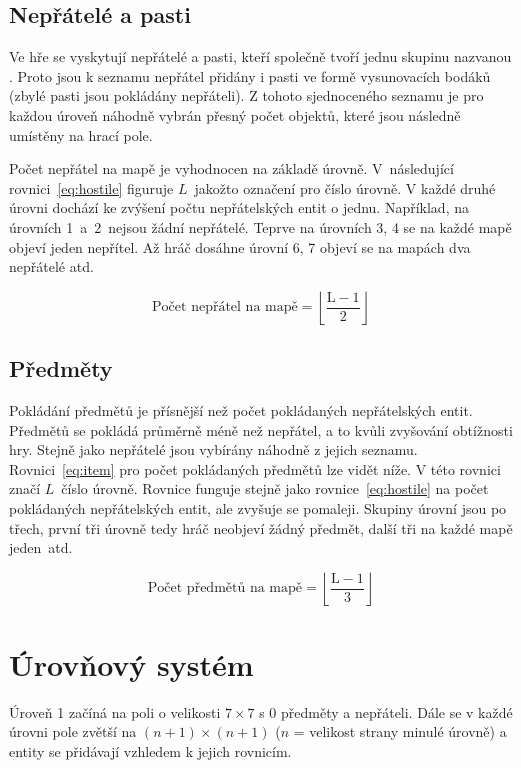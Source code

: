 \subsection*{Nepřátelé a pasti}
Ve hře se vyskytují nepřátelé a pasti, kteří společně tvoří jednu skupinu nazvanou . Proto jsou k seznamu nepřátel přidány i pasti ve formě vysunovacích bodáků (zbylé pasti jsou pokládány nepřáteli). Z tohoto sjednoceného seznamu je pro každou úroveň náhodně vybrán přesný počet objektů, které jsou následně umístěny na hrací pole.

Počet nepřátel na mapě je vyhodnocen na základě úrovně. V~následující rovnici~\ref{eq:hostile} figuruje $L$~jakožto označení pro číslo úrovně. V každé druhé úrovni dochází ke zvýšení počtu nepřátelských entit o jednu. Například, na úrovních 1~a~2~nejsou žádní nepřátelé. Teprve na úrovních 3, 4 se na každé mapě objeví jeden nepřítel. Až hráč dosáhne úrovní 6, 7 objeví se na mapách dva nepřátelé atd.

\begin{equation}
    \text{Počet nepřátel na mapě} = \left\lfloor \frac{\text{L} - 1}{2} \right\rfloor
\label{eq:hostile}
\end{equation}

\subsection*{Předměty}
Pokládání předmětů je přísnější než počet pokládaných nepřátelských entit. Předmětů se pokládá průměrně méně než nepřátel, a to kvůli zvyšování obtížnosti hry. Stejně jako nepřátelé jsou vybírány náhodně z jejich seznamu. Rovnici~\ref{eq:item} pro počet pokládaných předmětů lze vidět níže. V této rovnici značí $L$~číslo úrovně. Rovnice funguje stejně jako rovnice~\ref{eq:hostile} na počet pokládaných nepřátelských entit, ale zvyšuje se pomaleji. Skupiny úrovní jsou po třech, první tři úrovně tedy hráč neobjeví žádný předmět, další tři na každé mapě jeden~atd.

\begin{equation}
    \text{Počet předmětů na mapě} = \left\lfloor \frac{\text{L} - 1}{3} \right\rfloor
\label{eq:item}
\end{equation}

\section{Úrovňový systém}
Úroveň 1 začíná na poli o velikosti $7 \times 7$ s 0 předměty a nepřáteli. Dále se v každé úrovni pole zvětší na $(n + 1) \times (n + 1)$ ($n$ = velikost strany minulé úrovně) a entity se přidávají vzhledem k jejich rovnicím.


